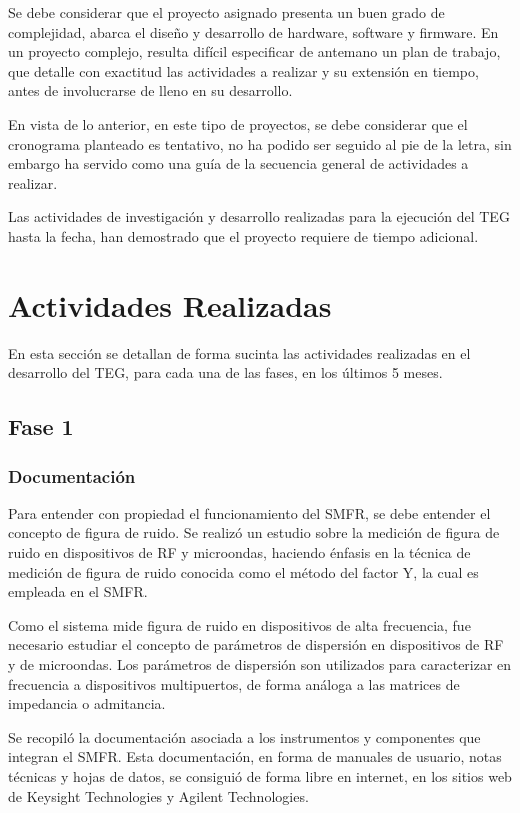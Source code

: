 \documentclass[paper=letter,oneside,fontsize=11pt, parskip=full]{scrartcl}
\begin{document}
	Se debe considerar que el proyecto asignado presenta un buen grado de complejidad, 
	abarca el diseño y desarrollo de hardware, software y firmware. En un proyecto complejo, resulta difícil especificar de antemano un plan de trabajo, que detalle con exactitud las actividades a realizar y su extensión en tiempo, antes de involucrarse de lleno en su desarrollo. 
	
	En vista de lo anterior, en este tipo de proyectos, se debe considerar que el cronograma planteado es tentativo, no ha podido ser seguido al pie de la letra, sin embargo ha servido como una guía de la secuencia general de actividades a realizar.

	Las actividades de investigación y desarrollo realizadas para la ejecución del TEG hasta la fecha, han demostrado que el proyecto requiere de tiempo adicional.	

	\section{Actividades Realizadas}
	
	En esta sección se detallan de forma sucinta las actividades realizadas en el desarrollo del TEG, para cada una de las fases, en los últimos 5 meses.
	
	\subsection{Fase 1}
	\subsubsection{Documentación}
	Para entender con propiedad el funcionamiento del SMFR, se debe entender el concepto de figura de ruido. Se realizó un estudio sobre la medición de figura de ruido en dispositivos de RF y microondas, haciendo énfasis en la técnica de medición de figura de ruido conocida como el método del factor Y, la cual es empleada en el SMFR.
	
	Como el sistema mide figura de ruido en dispositivos de alta frecuencia, fue necesario estudiar el concepto de parámetros de dispersión en dispositivos de RF y de microondas. Los parámetros de dispersión son utilizados para caracterizar en frecuencia a dispositivos multipuertos, de forma análoga a las matrices de impedancia o admitancia.
	
	Se recopiló la documentación asociada a los instrumentos y componentes que integran el SMFR. Esta documentación, en forma de manuales de usuario, notas técnicas y hojas de datos, se consiguió de forma libre en internet, en los sitios web de Keysight Technologies y Agilent Technologies. 	
	
\end{document}
